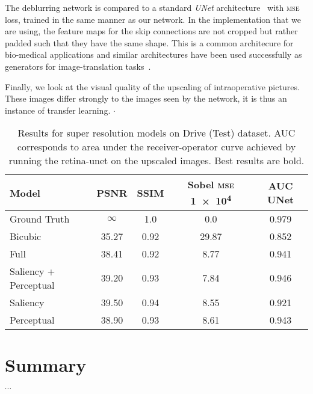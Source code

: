 \documentclass{scrartcl}
\begin{document}
The deblurring network is compared to a standard \textit{UNet} architecture~\cite{Unet} with \textsc{mse} loss, trained in the same manner as our network.
In the implementation that we are using, the feature maps for the skip connections are not cropped but rather padded such that they have the same shape.
This is a common architecure for bio-medical applications and similar architectures have been used successfully as generators for image-translation tasks~\cite{PatchGAN}.

Finally, we look at the visual quality of the upscaling of intraoperative pictures.
These images differ strongly to the images seen by the network, it is thus an instance of transfer learning.
$\cdot$


\begin{table}[]
\centering
\caption{Results for super resolution models on Drive (Test) dataset.
  AUC corresponds to area under the receiver-operator curve achieved by running the retina-unet on the upscaled images.
  Best results are bold.
}

\label{tab:results-sr}
\begin{tabular}{@{}lS[table-format=2.2]S[table-format=2.2]S[table-format=2.2]S[table-format=2.3]@{}}
\toprule
{Model} & {PSNR} & {SSIM} & {Sobel \textsc{mse} \SI{1e4}{}} & {AUC UNet} \\ \midrule
Ground Truth & $\infty$ & 1.0 & 0.0 & 0.979 \\
Bicubic & 35.27 & 0.92 & 29.87 &  0.852 \\
Full & 38.41 & 0.92 & 8.77 & 0.941 \\
Saliency + Perceptual & 39.20 & 0.93 & 7.84 & 0.946 \\
Saliency & 39.50 & 0.94 & 8.55 & 0.921 \\
Perceptual & 38.90 & 0.93 & 8.61 & 0.943 \\
\bottomrule
\end{tabular}
\end{table}


\section{Summary}
$\cdots$

\printbibliography
\end{document}
